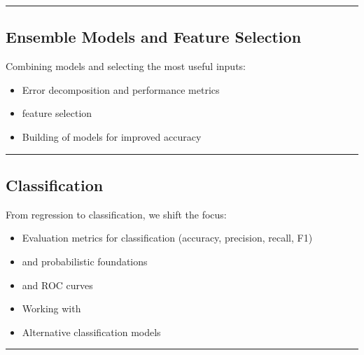 \documentclass[letterpaper,10pt,english]{jupyterBook}
\begin{document}
\bigskip\hrule\bigskip



\subsection{Ensemble Models and Feature Selection}
\label{\detokenize{introduction:ensemble-models-and-feature-selection}}
\sphinxAtStartPar
Combining models and selecting the most useful inputs:
\begin{itemize}
\item {} 
\sphinxAtStartPar
Error decomposition and performance metrics

\item {} 
\sphinxAtStartPar
{} feature selection

\item {} 
\sphinxAtStartPar
Building  of models for improved accuracy

\end{itemize}


\bigskip\hrule\bigskip



\subsection{Classification}
\label{\detokenize{introduction:classification}}
\sphinxAtStartPar
From regression to classification, we shift the focus:
\begin{itemize}
\item {} 
\sphinxAtStartPar
Evaluation metrics for classification (accuracy, precision, recall, F1)

\item {} 
\sphinxAtStartPar
{} and probabilistic foundations

\item {} 
\sphinxAtStartPar
{} and ROC curves

\item {} 
\sphinxAtStartPar
Working with 

\item {} 
\sphinxAtStartPar
Alternative classification models

\end{itemize}


\bigskip\hrule\bigskip
\end{document}

